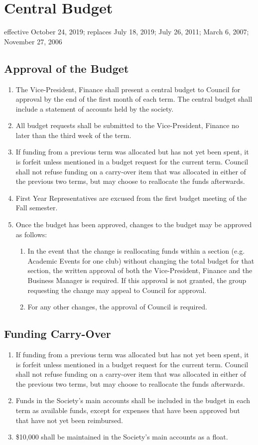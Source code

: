 \section{Central Budget}
effective October 24, 2019; replaces July 18, 2019; July 26, 2011; March 6, 2007; November 27, 2006

\subsection{Approval of the Budget}
\begin{enumerate}
\item The Vice-President, Finance shall present a central budget to Council for approval by the end of the first month of each term. The central budget shall include a statement of accounts held by the society.
\item All budget requests shall be submitted to the Vice-President, Finance no later than the third week of the term.
\item If funding from a previous term was allocated but has not yet been spent, it is forfeit unless mentioned in a budget request for the current term. Council shall not refuse funding on a carry-over item that was allocated in either of the previous two terms, but may choose to reallocate the funds afterwards.
\item First Year Representatives are excused from the first budget meeting of the Fall semester.
\item Once the budget has been approved, changes to the budget may be approved as follows:
\begin{enumerate}
\item In the event that the change is reallocating funds within a section (e.g. Academic Events for one club) without changing the total budget for that section, the written approval of both the Vice-President, Finance and the Business Manager is required. If this approval is not granted, the group requesting the change may appeal to Council for approval.
\item For any other changes, the approval of Council is required.
\end{enumerate}
\end{enumerate}


\subsection{Funding Carry-Over}
\begin{enumerate}
\item If funding from a previous term was allocated but has not yet been spent, it is forfeit unless mentioned in a budget request for the current term. Council shall not refuse funding on a carry-over item that was allocated in either of the previous two terms, but may choose to reallocate the funds afterwards.
\item Funds in the Society's main accounts shall be included in the budget in each term as available funds, except for expenses that have been approved but that have not yet been reimbursed.
\item \$10,000 shall be maintained in the Society's main accounts as a float.
\end{enumerate}

